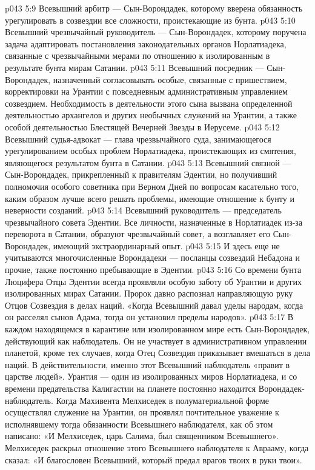 \vs p043 5:9 \pc {}\bibnobreakspace Всевышний арбитр --- Сын\hyp{}Ворондадек, которому вверена обязанность урегулировать в созвездии все сложности, проистекающие из бунта.
\vs p043 5:10 \pc {}\bibnobreakspace Всевышний чрезвычайный руководитель --- Сын\hyp{}Ворондадек, которому поручена задача адаптировать постановления законодательных органов Норлатиадека, связанные с чрезвычайными мерами по отношению к изолированным в результате бунта мирам Сатании.
\vs p043 5:11 \pc {}\bibnobreakspace Всевышний посредник --- Сын\hyp{}Ворондадек, назначенный согласовывать особые, связанные с пришествием, корректировки на Урантии с повседневным административным управлением созвездием. Необходимость в деятельности этого сына вызвана определенной деятельностью архангелов и других необычных служений на Урантии, а также особой деятельностью Блестящей Вечерней Звезды в Иерусеме.
\vs p043 5:12 \pc {}\bibnobreakspace Всевышний судья\hyp{}адвокат --- глава чрезвычайного суда, занимающегося урегулированием особых проблем Норлатиадека, проистекающих из смятения, являющегося результатом бунта в Сатании.
\vs p043 5:13 \pc {}\bibnobreakspace Всевышний связной --- Сын\hyp{}Ворондадек, прикрепленный к правителям Эдентии, но получивший полномочия особого советника при Верном Дней по вопросам касательно того, каким образом лучше всего решать проблемы, имеющие отношение к бунту и неверности созданий.
\vs p043 5:14 \pc {}\bibnobreakspace Всевышний руководитель --- председатель чрезвычайного совета Эдентии. Все личности, назначенные в Норлатиадек из\hyp{}за переворота в Сатании, образуют чрезвычайный совет, а возглавляет его Сын\hyp{}Ворондадек, имеющий экстраординарный опыт.
\vs p043 5:15 И здесь еще не учитываются многочисленные Ворондадеки --- посланцы созвездий Небадона и прочие, также постоянно пребывающие в Эдентии.
\vs p043 5:16 \pc Со времени бунта Люцифера Отцы Эдентии всегда проявляли особую заботу об Урантии и других изолированных мирах Сатании. Пророк давно распознал направляющую руку Отцов Созвездия в делах наций. «Когда Всевышний давал уделы народам, когда он расселял сынов Адама, тогда он установил пределы народов».
\vs p043 5:17 В каждом находящемся в карантине или изолированном мире есть Сын\hyp{}Ворондадек, действующий как наблюдатель. Он не участвует в административном управлении планетой, кроме тех случаев, когда Отец Созвездия приказывает вмешаться в дела наций. В действительности, именно этот Всевышний наблюдатель «правит в царстве людей». Урантия --- один из изолированных миров Норлатиадека, и со времени предательства Калигастии на планете постоянно находится Ворондадек\hyp{}наблюдатель. Когда Махивента Мелхиседек в полуматериальной форме осуществлял служение на Урантии, он проявлял почтительное уважение к исполнявшему тогда обязанности Всевышнего наблюдателя, как об этом написано: «И Мелхиседек, царь Салима, был священником Всевышнего». Мелхиседек раскрыл отношение этого Всевышнего наблюдателя к Аврааму, когда сказал: «И благословен Всевышний, который предал врагов твоих в руки твои».
